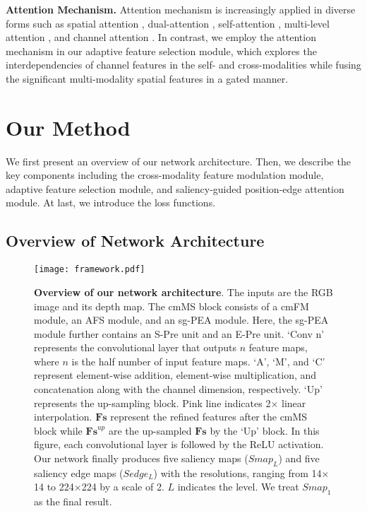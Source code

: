\documentclass[runningheads]{llncs}
\begin{document}
\noindent
\textbf{Attention Mechanism.}
Attention mechanism is increasingly applied in diverse forms such as spatial attention \cite{Spattention}, dual-attention \cite{DualAttention}, self-attention  \cite{Attention17}, multi-level attention \cite{MultiAttention}, and channel attention \cite{ChannelAttention}.
In contrast, we employ the attention mechanism in our adaptive feature selection module, which explores the interdependencies of channel features in the self- and cross-modalities while fusing the significant multi-modality spatial features in a gated manner.





\section{Our Method}
We first present an overview of our network architecture. Then, we describe the key components including the cross-modality feature modulation module, adaptive feature selection module, and saliency-guided position-edge attention module. At last, we introduce the loss functions.


\subsection{Overview of Network Architecture }

\begin{figure*}[!t]
	\centering
	\texttt{[image: framework.pdf]}
	\caption{\textbf{Overview of our network architecture}. The inputs are the RGB image and its depth map. The cmMS block consists of a cmFM module, an AFS module, and an sg-PEA module. Here, the sg-PEA module further contains an S-Pre unit and an E-Pre unit. `Conv n' represents the convolutional layer that outputs $n$ feature maps, where $n$ is the half number of input feature maps.  `A', `M', and `C' represent element-wise addition, element-wise multiplication, and concatenation along with the channel dimension, respectively. `Up' represents the up-sampling block. Pink line indicates 2$\times$ linear interpolation. $\mathbf{Fs}$ represent the refined features after the cmMS block while  $\mathbf{Fs}^{up}$ are the up-sampled $\mathbf{Fs}$ by the `Up' block.  In this figure, each convolutional layer is followed by the ReLU activation. Our network finally produces five saliency maps ($Smap_{L}$) and five saliency edge maps ($Sedge_{L}$) with the resolutions, ranging from 14$\times$14 to 224$\times$224 by a scale of 2. $L$ indicates the level. We treat $Smap_{1}$ as the final result.}
	\label{framework}
\end{figure*}
\end{document}
